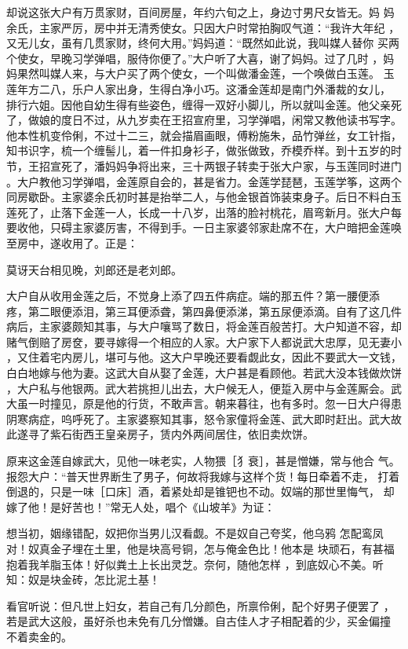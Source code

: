 却说这张大户有万贯家财，百间房屋，年约六旬之上，身边寸男尺女皆无。妈
妈余氏，主家严厉，房中并无清秀使女。只因大户时常拍胸叹气道：“我许大年纪
，又无儿女，虽有几贯家财，终何大用。”妈妈道：“既然如此说，我叫媒人替你
买两个使女，早晚习学弹唱，服侍你便了。”大户听了大喜，谢了妈妈。过了几时
，妈妈果然叫媒人来，与大户买了两个使女，一个叫做潘金莲，一个唤做白玉莲。
玉莲年方二八，乐户人家出身，生得白净小巧。这潘金莲却是南门外潘裁的女儿，
排行六姐。因他自幼生得有些姿色，缠得一双好小脚儿，所以就叫金莲。他父亲死
了，做娘的度日不过，从九岁卖在王招宣府里，习学弹唱，闲常又教他读书写字。
他本性机变伶俐，不过十二三，就会描眉画眼，傅粉施朱，品竹弹丝，女工针指，
知书识字，梳一个缠髻儿，着一件扣身衫子，做张做致，乔模乔样。到十五岁的时
节，王招宣死了，潘妈妈争将出来，三十两银子转卖于张大户家，与玉莲同时进门
。大户教他习学弹唱，金莲原自会的，甚是省力。金莲学琵琶，玉莲学筝，这两个
同房歇卧。主家婆余氏初时甚是抬举二人，与他金银首饰装束身子。后日不料白玉
莲死了，止落下金莲一人，长成一十八岁，出落的脸衬桃花，眉弯新月。张大户每
要收他，只碍主家婆厉害，不得到手。一日主家婆邻家赴席不在，大户暗把金莲唤
至房中，遂收用了。正是：

莫讶天台相见晚，刘郎还是老刘郎。

大户自从收用金莲之后，不觉身上添了四五件病症。端的那五件？第一腰便添
疼，第二眼便添泪，第三耳便添聋，第四鼻便添涕，第五尿便添滴。自有了这几件
病后，主家婆颇知其事，与大户嚷骂了数日，将金莲百般苦打。大户知道不容，却
赌气倒赔了房奁，要寻嫁得一个相应的人家。大户家下人都说武大忠厚，见无妻小
，又住着宅内房儿，堪可与他。这大户早晚还要看觑此女，因此不要武大一文钱，
白白地嫁与他为妻。这武大自从娶了金莲，大户甚是看顾他。若武大没本钱做炊饼
，大户私与他银两。武大若挑担儿出去，大户候无人，便踅入房中与金莲厮会。武
大虽一时撞见，原是他的行货，不敢声言。朝来暮往，也有多时。忽一日大户得患
阴寒病症，呜呼死了。主家婆察知其事，怒令家僮将金莲、武大即时赶出。武大故
此遂寻了紫石街西王皇亲房子，赁内外两间居住，依旧卖炊饼。

原来这金莲自嫁武大，见他一味老实，人物猥［犭衰］，甚是憎嫌，常与他合
气。报怨大户：“普天世界断生了男子，何故将我嫁与这样个货！每日牵着不走，
打着倒退的，只是一味［口床］酒，着紧处却是锥钯也不动。奴端的那世里悔气，
却嫁了他！是好苦也！”常无人处，唱个《山坡羊》为证：

想当初，姻缘错配，奴把你当男儿汉看觑。不是奴自己夸奖，他乌鸦
怎配鸾凤对！奴真金子埋在土里，他是块高号铜，怎与俺金色比！他本是
块顽石，有甚福抱着我羊脂玉体！好似粪土上长出灵芝。奈何，随他怎样
，到底奴心不美。听知：奴是块金砖，怎比泥土基！

看官听说：但凡世上妇女，若自己有几分颜色，所禀伶俐，配个好男子便罢了
，若是武大这般，虽好杀也未免有几分憎嫌。自古佳人才子相配着的少，买金偏撞
不着卖金的。

